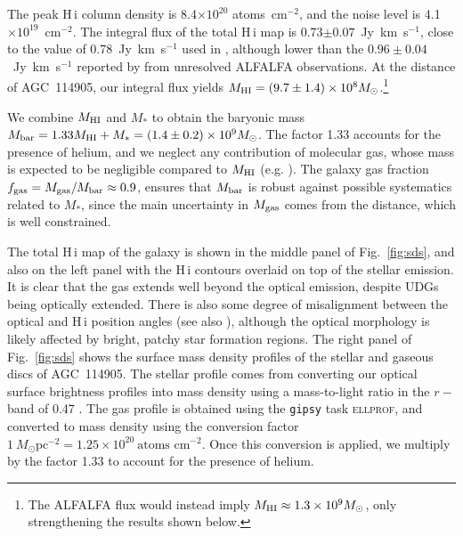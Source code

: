 \documentclass[fleqn,usenatbib]{mnras}
\begin{document}
The peak H\,{\sc i} column density is 8.4$\times 10^{20}$ atoms~cm$^{-2}$, and the noise level is 4.1$\times 10^{19}$~cm$^{-2}$. The integral flux of the total H\,{\sc i} map is 0.73$\pm 0.07$~Jy~km~s$^{-1}$, close to the value of 0.78~Jy~km~s$^{-1}$ used in \citet{huds2019}, although lower than the $0.96\pm 0.04$~Jy~km~s$^{-1}$ reported by \citet{leisman2017} from unresolved ALFALFA observations. At the distance of AGC~114905, our integral flux yields $M_{\rm HI} = (9.7\pm 1.4)\times 10^8 M_\odot$.\footnote{The ALFALFA flux would instead imply $M_{\rm HI} \approx 1.3\times 10^9 M_\odot$, only strengthening the results shown below.}



We combine $M_{\rm HI}$ and $M_\ast$ to obtain the baryonic mass $M_{\rm bar} = 1.33M_{\rm HI} + M_\ast = (1.4 \pm 0.2) \times 10^9 M_\odot$. The factor 1.33 accounts for the presence of helium, and we neglect any contribution of molecular gas, whose mass is expected to be negligible compared to $M_{\rm HI}$ (e.g. \citealt{hunter2019,CO_udgs}). The galaxy gas fraction $f_{\rm gas} = M_{\rm gas}/M_{\rm bar} \approx 0.9$, ensures that $M_{\rm bar}$ is robust against possible systematics related to $M_\ast$, since the main uncertainty in $M_{\rm gas}$ comes from the distance, which is well constrained. 


The total H\,{\sc i} map of the galaxy is shown in the middle panel of Fig.~\ref{fig:sds}, and also on the left panel with the H\,{\sc i} contours overlaid on top of the stellar emission. It is clear that the gas extends well beyond the optical emission, despite UDGs being optically extended. There is also some degree of misalignment between the optical and H\,{\sc i} position angles (see also \citealt{lexi}), although the optical morphology is likely affected by bright, patchy star formation regions. The right panel of Fig.~\ref{fig:sds} shows the surface mass density profiles of the stellar and gaseous discs of AGC~114905. The stellar profile comes from converting our optical surface brightness profiles into mass density using a mass-to-light ratio in the $r-$band of 0.47 \citep{du2020}. The gas profile is obtained using the \texttt{gipsy} \citep{gipsy} task \textsc{ellprof}, and converted to mass density using the conversion factor $1~M_\odot \textrm{pc}^{-2} = 1.25\times10^{20}~\textrm{atoms cm}^{-2}$. Once this conversion is applied, we multiply by the factor 1.33 to account for the presence of helium.
\end{document}
